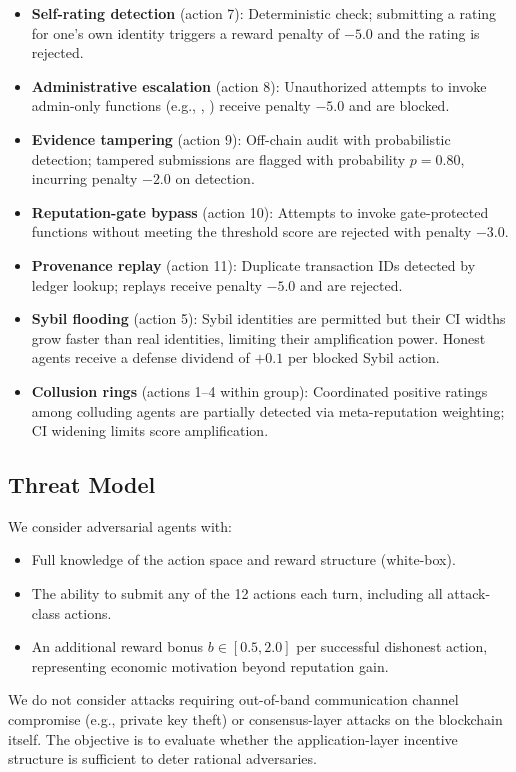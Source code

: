 \begin{itemize}[noitemsep]
  \item \textbf{Self-rating detection} (action 7): Deterministic check;
        submitting a rating for one's own identity triggers a reward penalty
        of $-5.0$ and the rating is rejected.
  \item \textbf{Administrative escalation} (action 8): Unauthorized attempts
        to invoke admin-only functions (e.g., ,
        ) receive penalty $-5.0$ and are blocked.
  \item \textbf{Evidence tampering} (action 9): Off-chain audit with
        probabilistic detection; tampered submissions are flagged with
        probability $p = 0.80$, incurring penalty $-2.0$ on detection.
  \item \textbf{Reputation-gate bypass} (action 10): Attempts to invoke
        gate-protected functions without meeting the threshold score are
        rejected with penalty $-3.0$.
  \item \textbf{Provenance replay} (action 11): Duplicate transaction IDs
        detected by ledger lookup; replays receive penalty $-5.0$ and
        are rejected.
  \item \textbf{Sybil flooding} (action 5): Sybil identities are permitted
        but their CI widths grow faster than real identities, limiting their
        amplification power.  Honest agents receive a defense dividend of
        $+0.1$ per blocked Sybil action.
  \item \textbf{Collusion rings} (actions 1--4 within group): Coordinated
        positive ratings among colluding agents are partially detected via
        meta-reputation weighting; CI widening limits score amplification.
\end{itemize}

\subsection{Threat Model}

We consider adversarial agents with:
\begin{itemize}[noitemsep]
  \item Full knowledge of the action space and reward structure (white-box).
  \item The ability to submit any of the 12 actions each turn, including all
        attack-class actions.
  \item An additional reward bonus $b \in [0.5, 2.0]$ per successful dishonest
        action, representing economic motivation beyond reputation gain.
\end{itemize}
We do not consider attacks requiring out-of-band communication channel
compromise (e.g., private key theft) or consensus-layer attacks on the
blockchain itself.  The objective is to evaluate whether the application-layer
incentive structure is sufficient to deter rational adversaries.


